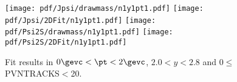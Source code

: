 \begin{figure}[H]
\begin{center}
\texttt{[image: pdf/Jpsi/drawmass/n1y1pt1.pdf]}
\texttt{[image: pdf/Jpsi/2DFit/n1y1pt1.pdf]}
\vspace*{-0.5cm}
\texttt{[image: pdf/Psi2S/drawmass/n1y1pt1.pdf]}
\texttt{[image: pdf/Psi2S/2DFit/n1y1pt1.pdf]}
\vspace*{-0.5cm}
\end{center}
\caption{Fit results in $0\gevc<\pt<2\gevc$, $2.0<y<2.8$ and 0$\leq$PVNTRACKS$<$20.}
\label{Fitn1y1pt1}
\end{figure}
